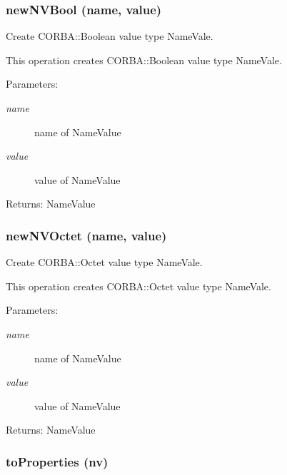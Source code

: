 \subsubsection{\setlength{\rightskip}{0pt plus 5cm}new\-NVBool (name, value)}\label{NVUtil_8py_a1}


Create CORBA::Boolean value type Name\-Vale. 

This operation creates CORBA::Boolean value type Name\-Vale.

\begin{Desc}
\item[Parameters:]
\begin{description}
\item[{\em name}]name of Name\-Value \item[{\em value}]value of Name\-Value \end{description}
\end{Desc}
\begin{Desc}
\item[Returns:]Name\-Value\end{Desc}
\subsubsection{\setlength{\rightskip}{0pt plus 5cm}new\-NVOctet (name, value)}\label{NVUtil_8py_a2}


Create CORBA::Octet value type Name\-Vale. 

This operation creates CORBA::Octet value type Name\-Vale.

\begin{Desc}
\item[Parameters:]
\begin{description}
\item[{\em name}]name of Name\-Value \item[{\em value}]value of Name\-Value \end{description}
\end{Desc}
\begin{Desc}
\item[Returns:]Name\-Value\end{Desc}
\subsubsection{\setlength{\rightskip}{0pt plus 5cm}to\-Properties (nv)}\label{NVUtil_8py_a6}


